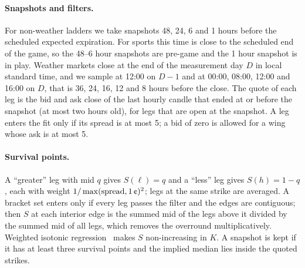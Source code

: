 \paragraph{Snapshots and filters.}
For non-weather ladders we take snapshots 48, 24, 6 and 1 hours before the scheduled expected
expiration. For sports this time is close to the scheduled end of the game, so the 48--6 hour
snapshots are pre-game and the 1 hour snapshot is in play. Weather markets close at the end of the
measurement day $D$ in local standard time, and we sample at 12:00 on $D-1$ and at 00:00, 08:00,
12:00 and 16:00 on $D$, that is 36, 24, 16, 12 and 8 hours before the close. The quote of each leg
is the bid and ask close of the last hourly candle that ended at or before the snapshot (at most
two hours old), for legs that are open at the snapshot. A leg enters the fit only if its spread is
at most 5\cents{}; a bid of zero is allowed for a wing whose ask is at most 5\cents.

\paragraph{Survival points.}
A ``greater'' leg with mid $q$ gives $S(\ell)=q$ and a ``less'' leg gives $S(h)=1-q$, each with
weight $1/\max(\text{spread},1\cents)^2$; legs at the same strike are averaged. A bracket set
enters only if every leg passes the filter and the edges are contiguous; then $S$ at each interior
edge is the summed mid of the legs above it divided by the summed mid of all legs, which removes
the overround multiplicatively. Weighted isotonic regression~\citep{barlow1972} makes $S$
non-increasing in $K$. A snapshot is kept if it has at least three survival points and the implied
median lies inside the quoted strikes.

